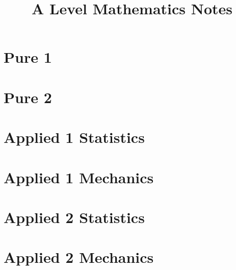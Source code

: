 \documentclass[oneside,fleqn,11pt]{book}
\title{A Level Mathematics Notes}
\begin{document}
\everymath{\displaystyle}
\maketitle
\tableofcontents

\part{Pure 1}


\part{Pure 2}
\setcounter{chapter}{0}


\part{Applied 1 Statistics}
\setcounter{chapter}{0}


\part{Applied 1 Mechanics}
\setcounter{chapter}{7}


\part{Applied 2 Statistics}
\setcounter{chapter}{0}


\part{Applied 2 Mechanics}
\setcounter{chapter}{3}

\end{document}
